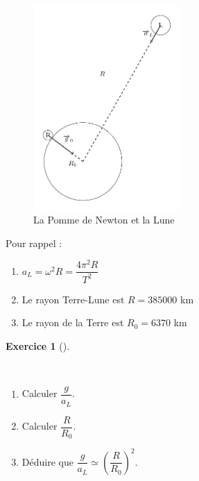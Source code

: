 \documentclass[
  letterpaper,
  DIV=11,
  numbers=noendperiod]{scrartcl}
\providecommand{\tightlist}{%
  \setlength{\itemsep}{0pt}\setlength{\parskip}{0pt}}\usepackage{longtable,booktabs,array}
\theoremstyle{definition}
\theoremstyle{definition}
\theoremstyle{definition}
\newtheorem{exercise}{Exercice}[section]
\theoremstyle{remark}
\begin{document}
\begin{figure}[H]

{\centering \includegraphics[width=0.5\textwidth,height=\textheight]{figures/grav/fig3.pdf}

}

\caption{La Pomme de Newton et la Lune}

\end{figure}%

Pour rappel :

\begin{enumerate}
\def\labelenumi{\arabic{enumi}.}
\tightlist
\item
  \(a_L = \omega^2 R = \dfrac{4\pi^2 R}{T^2}\)
\item
  Le rayon Terre-Lune est \(R = 385 000\) km
\item
  Le rayon de la Terre est \(R_0 = 6370\) km
\end{enumerate}

\begin{exercise}[]\protect\hypertarget{exr-lune}{}\label{exr-lune}

~

\begin{enumerate}
\def\labelenumi{\arabic{enumi}.}
\tightlist
\item
  Calculer \(\dfrac{g}{a_L}\).
\item
  Calculer \(\dfrac{R}{R_0}\).
\item
  Déduire que \(\dfrac{g}{a_L} \simeq \left(\dfrac{R}{R_0}\right)^2\).
\end{enumerate}

\end{exercise}
\end{document}
